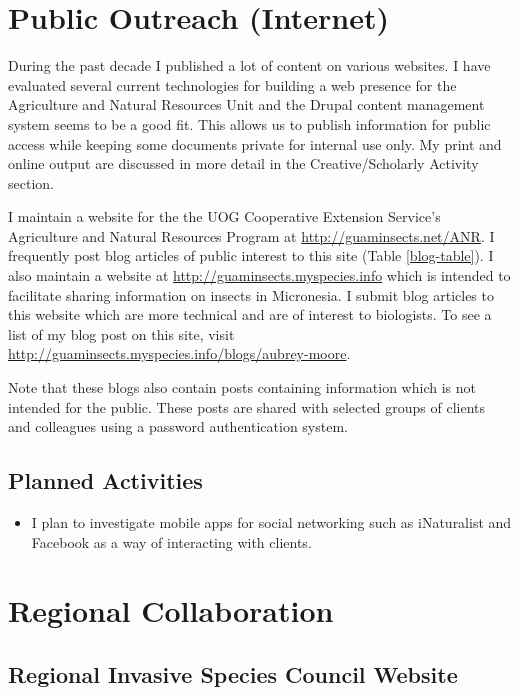 \documentclass[12pt,oneside,english]{scrbook}
\begin{document}
\section{Public Outreach (Internet)}

During the past decade I published a lot
of content on various websites. I have evaluated several current technologies
for building a web presence for the Agriculture and Natural Resources
Unit and the Drupal content management system seems to be a good fit.
This allows us to publish information for public access while keeping
some documents private for internal use only. My print and online
output are discussed in more detail in the Creative/Scholarly Activity
section. 

I maintain a website for the the UOG Cooperative Extension Service's
Agriculture and Natural Resources Program at \url{http://guaminsects.net/ANR}.
I frequently post blog articles of public interest to this site (Table
\ref{blog-table}). I also maintain a website at \url{http://guaminsects.myspecies.info}
which is intended to facilitate sharing information on insects in
Micronesia. I submit blog articles to this website which
are more technical and are of interest to biologists. To see a list of my blog post on this site, visit \url{http://guaminsects.myspecies.info/blogs/aubrey-moore}. 

Note that these blogs also contain posts containing information which is not intended for the public. These posts are shared with selected groups of clients and colleagues using a password authentication system.

\subsection{Planned Activities}
\begin{itemize}
\item I plan to investigate mobile apps for social networking such as iNaturalist and Facebook as a way of interacting with clients. 
\end{itemize}

%

\section{Regional Collaboration }

\subsection{Regional Invasive Species Council Website}
\end{document}
